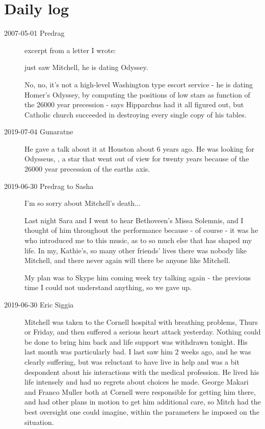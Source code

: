 

\chapter{Daily log}
\label{c-dailyBlog}

\begin{description}

\item[2007-05-01 Predrag] excerpt from a letter I wrote:

just saw Mitchell, he is dating Odyssey.

No, no, it's not a high-level Washington type escort service - he is
dating Homer's Odyssey, by computing the positions of low stars as
function of the 26000 year precession - says
 {Hipparchus}  had it all
figured out, but Catholic church succeeded in destroying every single
copy of his tables.

\item[2019-07-04 Gunaratne]

He gave a talk about it at Houston about 6 years ago. He was looking for
Odysseus, \ie, a star that went out of view for twenty years because of
the 26000 year precession of the earths axis.

\item[2019-06-30 Predrag to Sasha]

I'm so sorry about Mitchell's death...

Last night Sara and I went to hear Bethoveen's Missa Solemnis, and I
thought of him throughout the performance because - of course - it was he
who introduced me to this music, as to so much else that has shaped my
life. In my, Kathie's, so many other friends' lives there was nobody like
Mitchell, and there never again will there be anyone like Mitchell.

My plan was to Skype him coming week try talking again - the previous
time I could not understand anything, so we gave up.

\item[2019-06-30 Eric Siggia]
Mitchell was taken to the Cornell hospital with breathing problems, Thurs
or Friday, and then suffered a serious heart attack yesterday. Nothing
could be done to bring him back and life support was withdrawn tonight.
His last month was particularly bad. I last saw him 2 weeks ago, and he
was clearly suffering, but was reluctant to have live in help and was a
bit despondent about his interactions with the medical profession. He
lived his life intensely and had no regrets about choices he made. George
Makari and Franco Muller both at Cornell were responsible for getting him
there, and had other plans in motion to get him additional care, so Mitch
had the best oversight one could imagine, within the parameters he
imposed on the situation.


\end{description}
